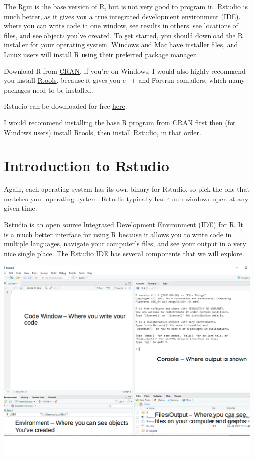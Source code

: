 \documentclass[
]{book}
\begin{document}
The Rgui is the base version of R, but is not very good to program in.
Rstudio is much better, as it gives you a true integrated development
environment (IDE), where you can write code in one window, see results
in others, see locations of files, and see objects you've created. To
get started, you should download the R installer for your operating
system. Windows and Mac have installer files, and Linux users will
install R using their preferred package manager.

Download R from \href{https://cran.r-project.org/}{CRAN}. If you're on
Windows, I would also highly recommend you install
\href{https://cran.r-project.org/}{Rtools}, because it gives you c++ and
Fortran compilers, which many packages need to be installed.

Rstudio can be downloaded for free
\href{https://rstudio.com/products/rstudio/download/}{here}.

I would recommend installing the base R program from CRAN first then
(for Windows users) install Rtools, then install Rstudio, in that order.

\hypertarget{introduction-to-rstudio}{%
\section{Introduction to Rstudio}\label{introduction-to-rstudio}}

Again, each operating system has its own binary for Rstudio, so pick the one that matches your operating system. Rstudio typically has 4 sub-windows open at any given time.

Rstudio is an open source Integrated Development Environment (IDE) for R. It is a much better interface for using R because it allows you to write code in multiple languages, navigate your computer's files, and see your output in a very nice single place. The Rstudio IDE has several components that we will explore.

\includegraphics{./images/rstudio.png}
\end{document}
